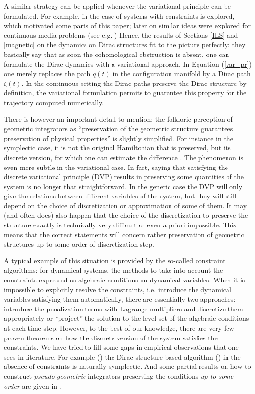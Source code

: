 \documentclass[a4paper,12pt]{amsart}
\theoremstyle{definition}
\begin{document}
A similar strategy can be applied whenever the variational principle can be formulated. For example, in \cite{MaWe} the case of systems with constraints is explored, which motivated some parts of this paper; {later on similar ideas were explored for continuous media problems (see e.g. \cite{gery})}
Hence, the results of Sections \ref{ILS} and \ref{magnetic} on the dynamics on Dirac structures fit to the picture perfectly: they basically say that as soon the cohomological obstruction is absent, one can formulate the Dirac dynamics with a variational approach. In Equation (\ref{var_pr}) one merely replaces the path $q(t)$ in the configuration manifold by a Dirac path $\zeta(t)$. In the continuous setting the Dirac paths preserve the Dirac structure by definition, the variational formulation permits to guarantee this property for the trajectory computed numerically.

There is however an important detail to mention: the folkloric perception of geometric integrators as ``preservation of the geometric structure guarantees preservation of physical properties'' is slightly simplified. For instance in the symplectic case, it is not the original Hamiltonian that is preserved, but its discrete version, for which one can estimate the difference \cite{CHR}. The phenomenon is even more subtle in the variational case. In fact, saying that satisfying the discrete variational principle (DVP) results in preserving some quantities of the system is no longer that straightforward. 
In the generic case the DVP will only give the relations between different variables of the system, but they will still depend on the choice of discretization or approximation of some of them. It may (and often does) also happen that the choice of the discretization to preserve the structure exactly is technically very difficult or even a priori impossible. This means that the correct statements will concern rather preservation of geometric structures up to some order of discretization step.  

{A typical example of this situation is provided by the so-called constraint algorithms: for dynamical systems, the methods to take into account the constraints expressed as algebraic conditions on dynamical variables. When it is impossible to explicitly resolve the constraints, i.e. introduce the dynamical variables satisfying them automatically, there are essentially two approaches: introduce the penalization terms with Lagrange multipliers and discretize them appropriately or ``project'' the solution to the level set of the algebraic conditions at each time step. However, to the best of our knowledge, there are very few proven theorems on how the discrete version of the system satisfies the constraints. We have tried to fill some gaps in empirical observations that one sees in literature. For example (\cite{SH-zamm}) the Dirac structure based algorithm (\cite{YoMa}) in the absence of constraints is naturally symplectic. And some partial results on how to construct \emph{pseudo-geometric} integrators preserving the conditions \emph{up to some order}  are given in \cite{Daria-prog}.}
\end{document}
